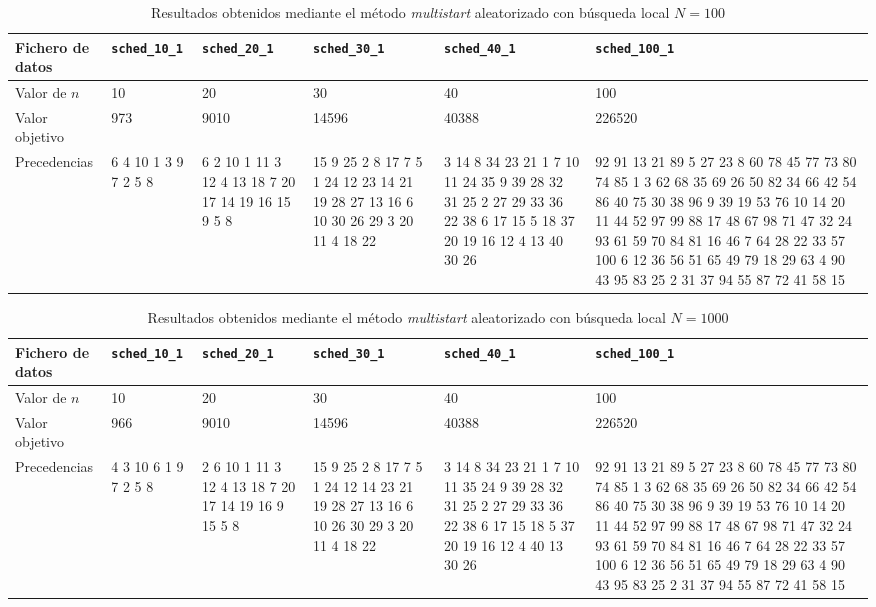 \documentclass[a4paper,11pt]{article}
\begin{document}
\begin{table}[!htbp]
\label{tb:results_multistart_local_100}
\centering\scriptsize
\begin{tabularx}{\textwidth}{|X|X|X|X|X|X|}
\hline
Fichero de datos	& \texttt{sched\_10\_1}	& \texttt{sched\_20\_1}	& \texttt{sched\_30\_1}	& \texttt{sched\_40\_1}	& \texttt{sched\_100\_1}	\\ \hline
Valor de $n$        & 10    & 20    & 30    & 40    & 100   \\ \hline
Valor objetivo      & 973   & 9010  &14596  & 40388 & 226520    \\ \hline
Precedencias        & 6 4 10 1 3 9 7 2 5 8  & 6 2 10 1 11 3 12 4 13 18 7 20 17 14 19 16 15 9 5 8    & 15 9 25 2 8 17 7 5 1 24 12 23 14 21 19 28 27 13 16 6 10 30 26 29 3 20 11 4 18 22  & 3 14 8 34 23 21 1 7 10 11 24 35 9 39 28 32 31 25 2 27 29 33 36 22 38 6 17 15 5 18 37 20 19 16 12 4 13 40 30 26    & 92 91 13 21 89 5 27 23 8 60 78 45 77 73 80 74 85 1 3 62 68 35 69 26 50 82 34 66 42 54 86 40 75 30 38 96 9 39 19 53 76 10 14 20 11 44 52 97 99 88 17 48 67 98 71 47 32 24 93 61 59 70 84 81 16 46 7 64 28 22 33 57 100 6 12 36 56 51 65 49 79 18 29 63 4 90 43 95 83 25 2 31 37 94 55 87 72 41 58 15   \\ \hline
\end{tabularx}
\caption{Resultados obtenidos mediante el método \textit{multistart} aleatorizado con búsqueda local ${N=100}$}
\end{table}

\begin{table}[!htbp]
\label{tb:results_multistart_local_1000}
\centering\scriptsize
\begin{tabularx}{\textwidth}{|X|X|X|X|X|X|}
\hline
Fichero de datos	& \texttt{sched\_10\_1}	& \texttt{sched\_20\_1}	& \texttt{sched\_30\_1}	& \texttt{sched\_40\_1}	& \texttt{sched\_100\_1}	\\ \hline
Valor de $n$        & 10    & 20    & 30    & 40    & 100   \\ \hline
Valor objetivo      & 966   & 9010  & 14596 & 40388 & 226520    \\ \hline
Precedencias        & 4 3 10 6 1 9 7 2 5 8  & 2 6 10 1 11 3 12 4 13 18 7 20 17 14 19 16 9 15 5 8    & 15 9 25 2 8 17 7 5 1 24 12 14 23 21 19 28 27 13 16 6 10 26 30 29 3 20 11 4 18 22    & 3 14 8 34 23 21 1 7 10 11 35 24 9 39 28 32 31 25 2 27 29 33 36 22 38 6 17 15 18 5 37 20 19 16 12 4 40 13 30 26  & 92 91 13 21 89 5 27 23 8 60 78 45 77 73 80 74 85 1 3 62 68 35 69 26 50 82 34 66 42 54 86 40 75 30 38 96 9 39 19 53 76 10 14 20 11 44 52 97 99 88 17 48 67 98 71 47 32 24 93 61 59 70 84 81 16 46 7 64 28 22 33 57 100 6 12 36 56 51 65 49 79 18 29 63 4 90 43 95 83 25 2 31 37 94 55 87 72 41 58 15   \\ \hline
\end{tabularx}
\caption{Resultados obtenidos mediante el método \textit{multistart} aleatorizado con búsqueda local ${N=1000}$}
\end{table}
\end{document}
